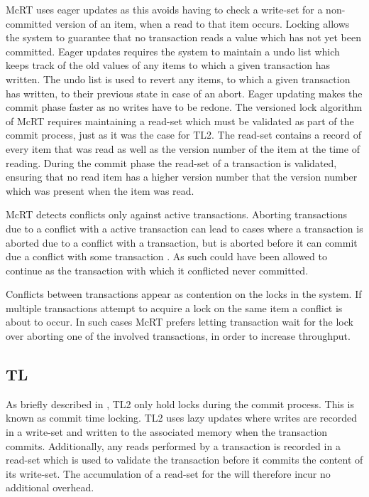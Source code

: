 McRT uses eager updates as this avoids having to check a write-set for a non-committed version of an item, when a read to that item occurs\cite[p. 109]{harris2010transactional}. Locking allows the system to guarantee that no transaction reads a value which has not yet been committed\cite[p. 108]{harris2010transactional}. Eager updates requires the system to maintain a undo list which keeps track of the old values of any items to which a given transaction has written. The undo list is used to revert any items, to which a given transaction has written, to their previous state in case of an abort\cite[p. 189]{saha2006mcrt}. Eager updating makes the commit phase faster as no writes have to be redone\cite[p. 190]{saha2006mcrt}. The versioned lock algorithm of McRT requires maintaining a read-set which must be validated as part of the commit process, just as it was the case for TL2. The read-set contains a record of every item that was read as well as the version number of the item at the time of reading. During the commit phase the read-set of a transaction is validated, ensuring that no read item has a higher version number that the version number which was present when the item was read\cite[p. 190]{saha2006mcrt}.

McRT detects conflicts only against active transactions\cite[p. 189]{saha2006mcrt}. Aborting transactions due to a conflict with a active transaction can lead to cases where a transaction  is aborted due to a conflict with a  transaction, but  is aborted before it can commit due a conflict with some transaction \cite[p. 2084]{herlihy2011tm}. As such  could have been allowed to continue as the transaction with which it conflicted never committed. 

Conflicts between transactions appear as contention on the locks in the system. If multiple transactions attempt to acquire a lock on the same item a conflict is about to occur. In such cases McRT prefers letting transaction wait for the lock over aborting one of the involved transactions, in order to increase throughput\cite[p. 189]{saha2006mcrt}.

\subsection{TL}
As briefly described in , TL2 only hold locks during the commit process\cite[p. 199]{dice2006transactional}. This is known as commit time locking. TL2 uses lazy updates where writes are recorded in a write-set and written to the associated memory when the transaction commits. Additionally, any reads performed by a transaction is recorded in a read-set which is used to validate the transaction before it commits the content of its write-set\cite[p. 198]{dice2006transactional}. The accumulation of a read-set for the  will therefore incur no additional overhead.


